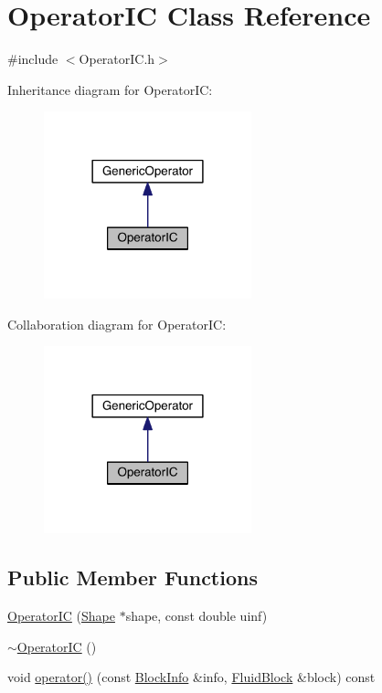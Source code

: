 \hypertarget{class_operator_i_c}{}\section{Operator\+I\+C Class Reference}
\label{class_operator_i_c}


{\ttfamily \#include $<$Operator\+I\+C.\+h$>$}



Inheritance diagram for Operator\+I\+C\+:\nopagebreak
\begin{figure}[H]
\begin{center}
\leavevmode
\includegraphics[width=170pt]{de/d5a/class_operator_i_c__inherit__graph}
\end{center}
\end{figure}


Collaboration diagram for Operator\+I\+C\+:\nopagebreak
\begin{figure}[H]
\begin{center}
\leavevmode
\includegraphics[width=170pt]{d0/de1/class_operator_i_c__coll__graph}
\end{center}
\end{figure}
\subsection*{Public Member Functions}
\begin{DoxyCompactItemize}
\item 
\hyperlink{class_operator_i_c_af14e9dfd3d846a60515c37e1084ade31}{Operator\+I\+C} (\hyperlink{class_shape}{Shape} $\ast$shape, const double uinf)
\item 
\hyperlink{class_operator_i_c_a6b34e54097004aa47d4ad402e28746c7}{$\sim$\+Operator\+I\+C} ()
\item 
void \hyperlink{class_operator_i_c_adf547defe5168b4bb0181df741a71144}{operator()} (const \hyperlink{struct_block_info}{Block\+Info} \&info, \hyperlink{struct_fluid_block}{Fluid\+Block} \&block) const 
\end{DoxyCompactItemize}


